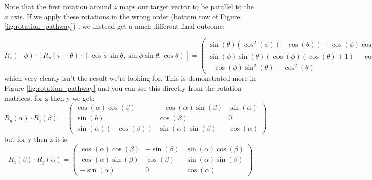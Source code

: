 \documentclass[10pt,a4paper,onecolumn]{report}
\begin{document}
 Note that the first rotation around $z$ maps our target vector to be parallel to the $x$ axis. If we apply these rotations in the wrong order (bottom row of Figure \ref{fig:rotation_pathway}) , we instead get a much different final outcome:


\begin{equation}
 R_z(-\phi) \cdot \left[ R_y(\pi-\theta) \cdot ( \cos \phi \sin \theta,  \sin \phi \sin \theta,  \cos \theta) \right] =  
\begin{pmatrix} 
    \sin (\theta ) \left(\cos ^2(\phi ) (-\cos (\theta ))+\cos (\phi )
   \cos (\theta )+\sin ^2(\phi )\right)
   \\
   \sin (\phi ) \sin (\theta ) (\cos
   (\phi ) (\cos (\theta )+1)-\cos (\theta ))
   \\
   -\cos (\phi ) \sin ^2(\theta
   )-\cos ^2(\theta ) 
   \end{pmatrix}
\end{equation}
which very clearly isn't the result we're looking for. This is demonstrated more in Figure \ref{fig:rotation_pathway} and you can see this directly from the rotation matrices, for z then y we get:
\begin{equation}
R_y(\alpha) \cdot R_z(\beta) = 
\begin{pmatrix}
 \cos (\alpha) \cos (\beta) & -\cos (\alpha) \sin (\beta) & \sin (\alpha) \\
 \sin (b) & \cos (\beta) & 0 \\
 \sin (\alpha) (-\cos (\beta)) & \sin (\alpha) \sin (\beta) & \cos (\alpha)
\end{pmatrix}
\end{equation}
but for y then z it is:
\begin{equation}
R_z(\beta) \cdot R_y(\alpha) = 
\begin{pmatrix}
 \cos (\alpha) \cos (\beta) & -\sin (\beta) & \sin (\alpha) \cos (\beta) \\
 \cos (\alpha) \sin (\beta) & \cos (\beta) & \sin (\alpha) \sin (\beta) \\
 -\sin (\alpha) & 0 & \cos (\alpha)
\end{pmatrix}
\end{equation}
\end{document}
